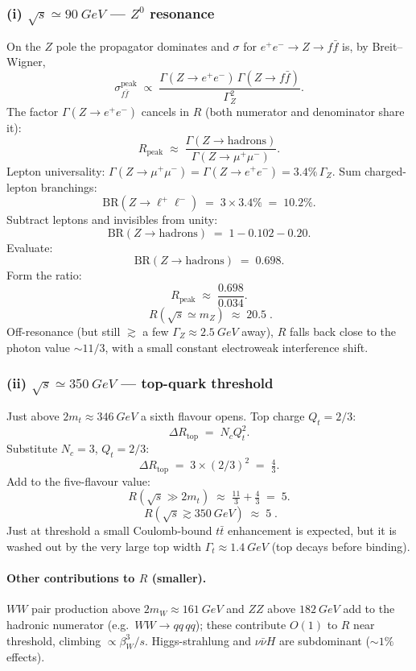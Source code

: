 \documentclass[11pt]{article}
\begin{document}
\subsubsection*{(i) $\sqrt s\simeq\SI{90}{GeV}$ --- $Z^{0}$ resonance}

On the $Z$ pole the propagator dominates and $\sigma$ for $e^{+}e^{-}\to Z\to f\bar f$ is, by Breit--Wigner,
\[
\sigma_{f\bar f}^{\text{peak}}\;\propto\;\frac{\Gamma(Z\to e^{+}e^{-})\,\Gamma(Z\to f\bar f)}{\Gamma_{Z}^{2}}.
\]
The factor $\Gamma(Z\to e^{+}e^{-})$ cancels in $R$ (both numerator and denominator share it):
\[
R_\text{peak}\;\approx\;\frac{\Gamma(Z\to\text{hadrons})}{\Gamma(Z\to\mu^{+}\mu^{-})}.
\]
Lepton universality: $\Gamma(Z\to\mu^{+}\mu^{-})=\Gamma(Z\to e^{+}e^{-})=3.4\%\,\Gamma_{Z}$. Sum charged-lepton branchings:
\[
\text{BR}(Z\to\ell^{+}\ell^{-})\;=\;3\times 3.4\%\;=\;10.2\%.
\]
Subtract leptons and invisibles from unity:
\[
\text{BR}(Z\to\text{hadrons})\;=\;1-0.102-0.20.
\]
Evaluate:
\[
\text{BR}(Z\to\text{hadrons})\;=\;0.698.
\]
Form the ratio:
\[
R_\text{peak}\;\approx\;\frac{0.698}{0.034}.
\]
\begin{equation}
\boxed{\;R(\sqrt s\simeq m_{Z})\;\approx\;20.5\;.}
\label{eq:Rpeak-Z}
\end{equation}
Off-resonance (but still $\gtrsim$ a few $\Gamma_{Z}\approx\SI{2.5}{GeV}$ away), $R$ falls back close to the photon value $\sim 11/3$, with a small constant electroweak interference shift.

\subsubsection*{(ii) $\sqrt s\simeq\SI{350}{GeV}$ --- top-quark threshold}

Just above $2m_{t}\approx\SI{346}{GeV}$ a sixth flavour opens. Top charge $Q_{t}=2/3$:
\[
\Delta R_\text{top}\;=\;N_{c}Q_{t}^{2}.
\]
Substitute $N_{c}=3$, $Q_{t}=2/3$:
\[
\Delta R_\text{top}\;=\;3\times(2/3)^{2}\;=\;\tfrac{4}{3}.
\]
Add to the five-flavour value:
\[
R(\sqrt s\!\gg\!2m_{t})\;\approx\;\tfrac{11}{3}+\tfrac{4}{3}\;=\;5.
\]
\begin{equation}
\boxed{\;R(\sqrt s\gtrsim\SI{350}{GeV})\;\approx\;5\;.}
\label{eq:R-top}
\end{equation}
Just at threshold a small Coulomb-bound $t\bar t$ enhancement is expected, but it is washed out by the very large top width $\Gamma_{t}\approx\SI{1.4}{GeV}$ (top decays before binding).

\paragraph{Other contributions to $R$ (smaller).} $WW$ pair production above $2m_{W}\approx\SI{161}{GeV}$ and $ZZ$ above $\SI{182}{GeV}$ add to the hadronic numerator (e.g.\ $WW\to qq\,qq$); these contribute $O(1)$ to $R$ near threshold, climbing $\propto\beta_{W}^{3}/s$. Higgs-strahlung and $\nu\bar\nu H$ are subdominant ($\sim 1\%$ effects).
\end{document}
